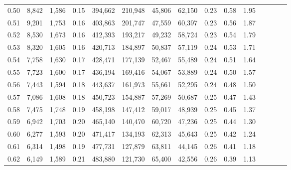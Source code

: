 \begin{tabular}{rrrcrrrrrrrrrrr}
0.50 &   8,842 &  1,586 &                                       0.15 &  394,662 &  210,948 &   45,806 &   62,150 &  0.23 &  0.58 &                         1.95 \\
0.51 &   9,201 &  1,753 &                                       0.16 &  403,863 &  201,747 &   47,559 &   60,397 &  0.23 &  0.56 &                         1.87 \\
0.52 &   8,530 &  1,673 &                                       0.16 &  412,393 &  193,217 &   49,232 &   58,724 &  0.23 &  0.54 &                         1.79 \\
0.53 &   8,320 &  1,605 &                                       0.16 &  420,713 &  184,897 &   50,837 &   57,119 &  0.24 &  0.53 &                         1.71 \\
0.54 &   7,758 &  1,630 &                                       0.17 &  428,471 &  177,139 &   52,467 &   55,489 &  0.24 &  0.51 &                         1.64 \\
0.55 &   7,723 &  1,600 &                                       0.17 &  436,194 &  169,416 &   54,067 &   53,889 &  0.24 &  0.50 &                         1.57 \\
0.56 &   7,443 &  1,594 &                                       0.18 &  443,637 &  161,973 &   55,661 &   52,295 &  0.24 &  0.48 &                         1.50 \\
0.57 &   7,086 &  1,608 &                                       0.18 &  450,723 &  154,887 &   57,269 &   50,687 &  0.25 &  0.47 &                         1.43 \\
0.58 &   7,475 &  1,748 &                                       0.19 &  458,198 &  147,412 &   59,017 &   48,939 &  0.25 &  0.45 &                         1.37 \\
0.59 &   6,942 &  1,703 &                                       0.20 &  465,140 &  140,470 &   60,720 &   47,236 &  0.25 &  0.44 &                         1.30 \\
0.60 &   6,277 &  1,593 &                                       0.20 &  471,417 &  134,193 &   62,313 &   45,643 &  0.25 &  0.42 &                         1.24 \\
0.61 &   6,314 &  1,498 &                                       0.19 &  477,731 &  127,879 &   63,811 &   44,145 &  0.26 &  0.41 &                         1.18 \\
0.62 &   6,149 &  1,589 &                                       0.21 &  483,880 &  121,730 &   65,400 &   42,556 &  0.26 &  0.39 &                         1.13 \\

\end{tabular}
